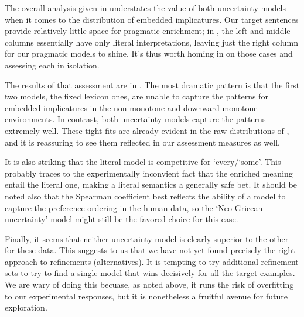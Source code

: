 \documentclass[leqno]{article}
\begin{document}
The overall analysis given in  understates the
value of both uncertainty models when it comes to the distribution of
embedded implicatures. Our target sentences provide relatively little
space for pragmatic enrichment; in , the left
and middle columns essentially have only literal interpretations,
leaving just the right column for our pragmatic models to shine. It's
thus worth homing in on those cases and assessing each in
isolation. 

The results of that assessment are in .  The
most dramatic pattern is that the first two models, the fixed lexicon
ones, are unable to capture the patterns for embedded implicatures in
the non-monotone and downward monotone environments. In contrast, both
uncertainty models capture the patterns extremely well. These tight
fits are already evident in the raw distributions of
, and it is reassuring to see them reflected
in our assessment measures as well. 

It is also striking that the literal model is competitive for
`every/`some'. This probably traces to the experimentally inconvient
fact that the enriched meaning entail the literal one, making a
literal semantics a generally safe bet. It should be noted also that
the Spearman coefficient best reflects the ability of a model to
capture the preference ordering in the human data, so the `Neo-Gricean
uncertainty' model might still be the favored choice for this case.

Finally, it seems that neither uncertainty model is clearly superior
to the other for these data.  This suggests to us that we have not yet
found precisely the right approach to refinements (alternatives). It
is tempting to try additional refinement sets to try to find a single
model that wins decisively for all the target examples. We are wary of
doing this becuase, as noted above, it runs the risk of overfitting to
our experimental responses, but it is nonetheless a fruitful avenue
for future exploration.
\end{document}
